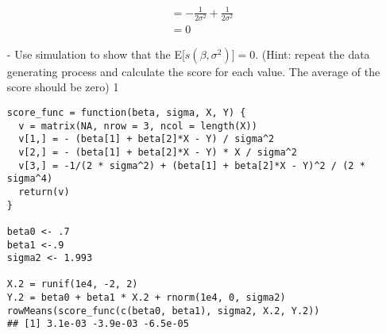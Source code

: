 \documentclass[letterpaper,12pt]{article}
\numberwithin{equation}{section}
\numberwithin{equation}{section}
\newcommand{\solutions}{1}
\begin{document}
\begin{itemize}
{\begin{align*}
  \\
  &= - \frac{1}{2 \sigma^2} + \frac{1}{2 \sigma^2}
  \\
  &= 0
\end{align*}
}
\fi
\item[-] Use simulation to show that the  E[$s(\beta, \sigma^2)] = 0$.  (Hint: repeat the data generating process and calculate the score for each value.  The average of the score should be zero)
\if \solutions1
{\color{red}
\begin{verbatim}
score_func = function(beta, sigma, X, Y) {
  v = matrix(NA, nrow = 3, ncol = length(X))
  v[1,] = - (beta[1] + beta[2]*X - Y) / sigma^2
  v[2,] = - (beta[1] + beta[2]*X - Y) * X / sigma^2
  v[3,] = -1/(2 * sigma^2) + (beta[1] + beta[2]*X - Y)^2 / (2 * sigma^4)
  return(v)
}

beta0 <- .7
beta1 <-.9
sigma2 <- 1.993

X.2 = runif(1e4, -2, 2)
Y.2 = beta0 + beta1 * X.2 + rnorm(1e4, 0, sigma2)
rowMeans(score_func(c(beta0, beta1), sigma2, X.2, Y.2))
## [1] 3.1e-03 -3.9e-03 -6.5e-05
\end{verbatim}
}
\fi
\end{itemize}
\end{document}

